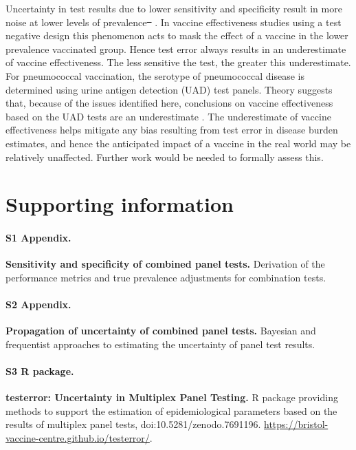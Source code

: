 \documentclass[10pt,letterpaper]{article}
\providecommand{\DIFaddtex}[1]{{\protect\color{blue}\uwave{#1}}} %
\providecommand{\DIFdeltex}[1]{{\protect\color{red}\sout{#1}}}                      %
\providecommand{\DIFaddbegin}{} %
\providecommand{\DIFaddend}{} %
\providecommand{\DIFdelbegin}{} %
\providecommand{\DIFdelend}{} %
\providecommand{\DIFadd}[1]{\texorpdfstring{\DIFaddtex{#1}}{#1}} %
\providecommand{\DIFdel}[1]{\texorpdfstring{\DIFdeltex{#1}}{}} %
\newcommand{\DIFscaledelfig}{0.5}
\newlength{\DIFdelgraphicswidth} %
\newlength{\DIFdelgraphicsheight} %
\newcommand{\DIFaddincludegraphics}[2][]{{\color{blue}\fbox{\DIFOincludegraphics[#1]{#2}}}} %
\newcommand{\DIFdelincludegraphics}[2][]{%
\sbox{\DIFdelgraphicsbox}{\DIFOincludegraphics[#1]{#2}}%
\settoboxwidth{\DIFdelgraphicswidth}{\DIFdelgraphicsbox} %
\settoboxtotalheight{\DIFdelgraphicsheight}{\DIFdelgraphicsbox} %
\scalebox{\DIFscaledelfig}{%
\parbox[b]{\DIFdelgraphicswidth}{\usebox{\DIFdelgraphicsbox}\\[-\baselineskip] \rule{\DIFdelgraphicswidth}{0em}}\llap{\resizebox{\DIFdelgraphicswidth}{\DIFdelgraphicsheight}{%
\setlength{\unitlength}{\DIFdelgraphicswidth}%
\begin{picture}(1,1)%
\thicklines\linethickness{2pt} %
{\color[rgb]{1,0,0}\put(0,0){\framebox(1,1){}}}%
{\color[rgb]{1,0,0}\put(0,0){\line( 1,1){1}}}%
{\color[rgb]{1,0,0}\put(0,1){\line(1,-1){1}}}%
\end{picture}%
}\hspace*{3pt}}} %
} %
\DeclareRobustCommand{\DIFaddbegin}{\DIFOaddbegin \let\includegraphics\DIFaddincludegraphics} %
\DeclareRobustCommand{\DIFaddend}{\DIFOaddend \let\includegraphics\DIFOincludegraphics} %
\DeclareRobustCommand{\DIFdelbegin}{\DIFOdelbegin \let\includegraphics\DIFdelincludegraphics} %
\DeclareRobustCommand{\DIFdelend}{\DIFOaddend \let\includegraphics\DIFOincludegraphics} %
\begin{document}
Uncertainty in test results due to lower sensitivity and specificity result in more noise at lower levels of prevalence\DIFdelbegin \DIFdel{\mbox{%
\cite{haile2022,endo2020}}\hspace{0pt}%
}\DIFdelend \DIFaddbegin \DIFadd{\mbox{%
\cite{haile2024,endo2020}}\hspace{0pt}%
}\DIFaddend . In vaccine effectiveness studies using a test negative design this phenomenon acts to mask the effect of a vaccine in the lower prevalence vaccinated group. Hence test error always results in an underestimate of vaccine effectiveness\cite{endo2020}. The less sensitive the test, the greater this underestimate. For pneumococcal vaccination, the serotype of pneumococcal disease is determined using urine antigen detection (UAD) test panels\cite{pride2012,bonten2015}. Theory suggests that, because of the issues identified here, conclusions on vaccine effectiveness based on the UAD tests are an underestimate \cite{endo2020}. The underestimate of vaccine effectiveness helps mitigate any bias resulting from test error in disease burden estimates, and hence the anticipated impact of a vaccine in the real world may be relatively unaffected. Further work would be needed to formally assess this.

\section*{Supporting information}


\paragraph*{S1 Appendix.}
\label{S1_Appendix}
{\bf Sensitivity and specificity of combined panel tests.} Derivation of the performance metrics and true prevalence adjustments for combination tests.

\paragraph*{S2 Appendix.}
\label{S2_Appendix}
{\bf Propagation of uncertainty of combined panel tests.} Bayesian and frequentist approaches to estimating the uncertainty of panel test results.

\paragraph*{S3 R package.}
\label{S3_Github}
{\bf testerror: Uncertainty in Multiplex Panel Testing.}  R package providing methods to support the estimation of epidemiological parameters based on the results of multiplex panel tests, doi:10.5281/zenodo.7691196. \url{https://bristol-vaccine-centre.github.io/testerror/}.
\end{document}
